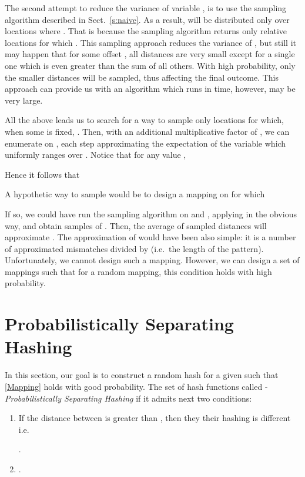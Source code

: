 \documentclass[11pt]{article}
\begin{document}
The second attempt to reduce the variance of variable , is to
use the sampling algorithm described in Sect.~\ref{s:naive}. As a
result,  will be distributed only over locations where
. That is because the sampling algorithm
returns only relative locations  for which .
This sampling approach reduces the variance of , but still it
may happen that for some offset , all distances are very small
except for a single one which is even greater than the sum of all
others. With high probability, only the smaller distances will be
sampled, thus affecting the final outcome. This approach can
provide us with an algorithm which runs in  time, however,
 may be very large.

All the above leads us to search for a way to sample only
locations  for which, when some  is fixed, . Then, with an additional multiplicative
factor of , we can enumerate on
, each step approximating the
expectation of the variable  which uniformly ranges over . Notice
that for any value ,

Hence it follows that

A hypothetic way to sample  would be to design a mapping
 on  for which

If so, we could have run the sampling algorithm on
 and , applying  in
the obvious way, and obtain samples of . Then, the average of
sampled distances will approximate . The approximation
of  would have been also simple: it is a number
of approximated mismatches divided by  (i.e.\ the length of the
pattern). Unfortunately, we cannot design such a mapping. However,
we can design a set of mappings such that for a random mapping,
this condition holds with high probability.



\section{Probabilistically Separating Hashing} \label{s:mapping}
 In this section, our goal is to construct a random
hash  for a given  such that \eqref{Mapping} holds with
good probability. The set of hash functions  called
-\emph{Probabilistically Separating Hashing }if it admits next
two conditions:
\begin{enumerate}
\item If the distance between  is greater than , then they
their hashing is different  i.e.\

  .
\item  .
\end{enumerate}
\end{document}
